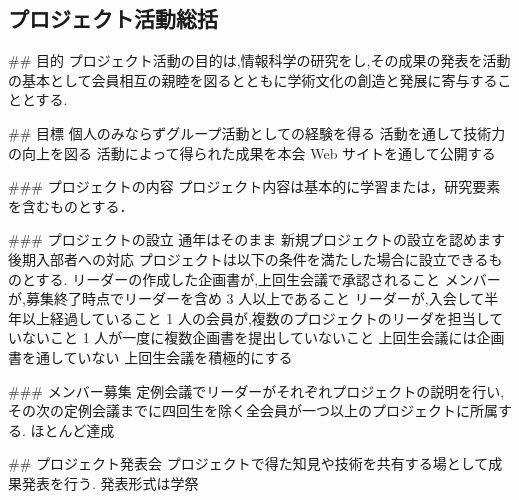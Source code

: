 \subsection*{プロジェクト活動総括}


## 目的
プロジェクト活動の目的は,情報科学の研究をし,その成果の発表を活動の基本として会員相互の親睦を図るとともに学術文化の創造と発展に寄与することとする.

## 目標
個人のみならずグループ活動としての経験を得る
活動を通して技術力の向上を図る
活動によって得られた成果を本会 Web サイトを通して公開する

### プロジェクトの内容
プロジェクト内容は基本的に学習または，研究要素を含むものとする．

### プロジェクトの設立
通年はそのまま
新規プロジェクトの設立を認めます
後期入部者への対応
プロジェクトは以下の条件を満たした場合に設立できるものとする.
リーダーの作成した企画書が,上回生会議で承認されること
メンバーが,募集終了時点でリーダーを含め 3 人以上であること
リーダーが,入会して半年以上経過していること
1 人の会員が,複数のプロジェクトのリーダを担当していないこと
1 人が一度に複数企画書を提出していないこと
上回生会議には企画書を通していない
上回生会議を積極的にする

### メンバー募集
定例会議でリーダーがそれぞれプロジェクトの説明を行い,その次の定例会議までに四回生を除く全会員が一つ以上のプロジェクトに所属する.
ほとんど達成


## プロジェクト発表会
プロジェクトで得た知見や技術を共有する場として成果発表を行う.
発表形式は学祭
